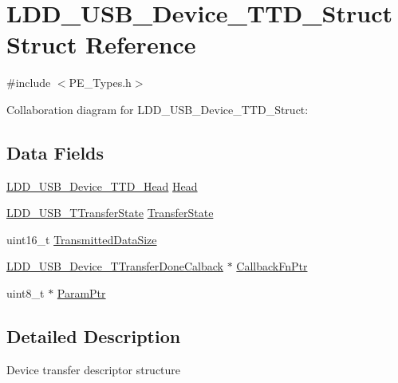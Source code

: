 \hypertarget{struct_l_d_d___u_s_b___device___t_t_d___struct}{}\section{L\+D\+D\+\_\+\+U\+S\+B\+\_\+\+Device\+\_\+\+T\+T\+D\+\_\+\+Struct Struct Reference}
\label{struct_l_d_d___u_s_b___device___t_t_d___struct}


{\ttfamily \#include $<$P\+E\+\_\+\+Types.\+h$>$}



Collaboration diagram for L\+D\+D\+\_\+\+U\+S\+B\+\_\+\+Device\+\_\+\+T\+T\+D\+\_\+\+Struct\+:
\subsection*{Data Fields}
\begin{DoxyCompactItemize}
\item 
\hyperlink{group___p_e___types__module_gac26d0354d0c874cd4e4580525d70c0c1}{L\+D\+D\+\_\+\+U\+S\+B\+\_\+\+Device\+\_\+\+T\+T\+D\+\_\+\+Head} \hyperlink{struct_l_d_d___u_s_b___device___t_t_d___struct_ad47a09c58fd746fa8ab14b9329234d4f}{Head}
\item 
\hyperlink{group___p_e___types__module_gacf5f7e704d87aba90dc002ed7c0d28b4}{L\+D\+D\+\_\+\+U\+S\+B\+\_\+\+T\+Transfer\+State} \hyperlink{struct_l_d_d___u_s_b___device___t_t_d___struct_a361e6414038c7475b4231dcbfe549250}{Transfer\+State}
\item 
uint16\+\_\+t \hyperlink{struct_l_d_d___u_s_b___device___t_t_d___struct_a4efcf1223981c7a05b9cc518e95f94db}{Transmitted\+Data\+Size}
\item 
\hyperlink{group___p_e___types__module_ga6545c6cb759931c367f2f974344c2201}{L\+D\+D\+\_\+\+U\+S\+B\+\_\+\+Device\+\_\+\+T\+Transfer\+Done\+Calback} $\ast$ \hyperlink{struct_l_d_d___u_s_b___device___t_t_d___struct_a8d8ed1c7580311a6d2287dc4c6b87ca2}{Callback\+Fn\+Ptr}
\item 
uint8\+\_\+t $\ast$ \hyperlink{struct_l_d_d___u_s_b___device___t_t_d___struct_a0cbbfa80ed5a4b953a2c15f35bbe6c80}{Param\+Ptr}
\end{DoxyCompactItemize}


\subsection{Detailed Description}
Device transfer descriptor structure 

